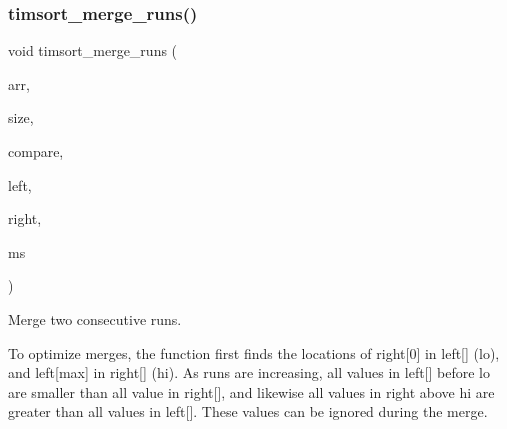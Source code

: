 \subsubsection{\texorpdfstring{timsort\+\_\+merge\+\_\+runs()}{timsort\_merge\_runs()}}
{\footnotesize\ttfamily void timsort\+\_\+merge\+\_\+runs (\begin{DoxyParamCaption}\item[{void $\ast$}]{arr,  }\item[{size\+\_\+t}]{size,  }\item[{int($\ast$)(const void $\ast$, const void $\ast$)}]{compare,  }\item[{\hyperlink{structTimsortRun}{Timsort\+Run} $\ast$}]{left,  }\item[{\hyperlink{structTimsortRun}{Timsort\+Run} $\ast$}]{right,  }\item[{\hyperlink{structTimsortMergeState}{Timsort\+Merge\+State} $\ast$}]{ms }\end{DoxyParamCaption})}



Merge two consecutive runs. 

To optimize merges, the function first finds the locations of right\mbox{[}0\mbox{]} in left\mbox{[}\mbox{]} (lo), and left\mbox{[}max\mbox{]} in right\mbox{[}\mbox{]} (hi). As runs are increasing, all values in left\mbox{[}\mbox{]} before \textquotesingle{}lo\textquotesingle{} are smaller than all value in right\mbox{[}\mbox{]}, and likewise all values in right above \textquotesingle{}hi\textquotesingle{} are greater than all values in left\mbox{[}\mbox{]}. These values can be ignored during the merge.


